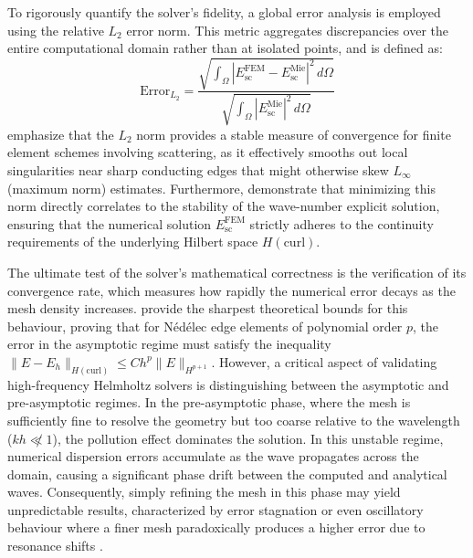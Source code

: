 To rigorously quantify the solver's fidelity, a global error analysis is employed using the relative $L_2$ error norm. This metric aggregates discrepancies over the entire computational domain rather than at isolated points, and is defined as:
\begin{equation}
\text{Error}_{L_2} = \frac{\sqrt{\int_{\Omega} |E_{\text{sc}}^{\text{FEM}} - E_{\text{sc}}^{\text{Mie}}|^2 \, d\Omega}}{\sqrt{\int_{\Omega} |E_{\text{sc}}^{\text{Mie}}|^2 \, d\Omega}}
\label{eq:l2_error}
\end{equation}
\citet{Hsiao2002} emphasize that the $L_2$ norm provides a stable measure of convergence for finite element schemes involving scattering, as it effectively smooths out local singularities near sharp conducting edges that might otherwise skew $L_{\infty}$ (maximum norm) estimates. Furthermore, \citet{Melenk2024} demonstrate that minimizing this norm directly correlates to the stability of the wave-number explicit solution, ensuring that the numerical solution $E_{\text{sc}}^{\text{FEM}}$ strictly adheres to the continuity requirements of the underlying Hilbert space $H(\text{curl})$.

\vspace{12pt}

The ultimate test of the solver's mathematical correctness is the verification of its convergence rate, which measures how rapidly the numerical error decays as the mesh density increases. \citet{Frelet2024} provide the sharpest theoretical bounds for this behaviour, proving that for Nédélec edge elements of polynomial order $p$, the error in the asymptotic regime must satisfy the inequality $\|E - E_h\|_{H(\text{curl})} \le C h^p \|E\|_{H^{p+1}}$. However, a critical aspect of validating high-frequency Helmholtz solvers is distinguishing between the asymptotic and pre-asymptotic regimes. In the pre-asymptotic phase, where the mesh is sufficiently fine to resolve the geometry but too coarse relative to the wavelength ($kh \not\ll 1$), the pollution effect dominates the solution. In this unstable regime, numerical dispersion errors accumulate as the wave propagates across the domain, causing a significant phase drift between the computed and analytical waves. Consequently, simply refining the mesh in this phase may yield unpredictable results, characterized by error stagnation or even oscillatory behaviour where a finer mesh paradoxically produces a higher error due to resonance shifts \citep{Melenk2024}.

\vspace{12pt}


